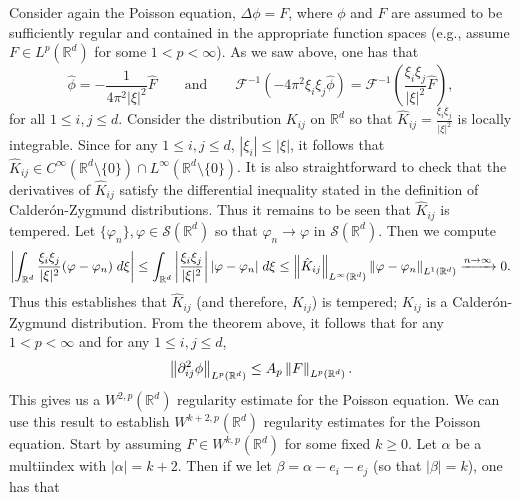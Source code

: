 \documentclass{article}
\begin{document}
\begin{example}
	Consider again the Poisson equation, $\Delta \phi = F$, where $\phi$ and $F$ are assumed to be sufficiently regular and contained in the appropriate function spaces (e.g., assume $F \in L^{p}(\mathbb{R}^{d})$ for some $1 < p < \infty$). As we saw above, one has that 
	\begin{equation*}
		\hat{\phi} = -\frac{1}{4\pi^{2}|\xi|^{2}}\hat{F} \qquad \text{and} \qquad \mathcal{F}^{-1}(-4\pi^{2}\xi_{i}\xi_{j}\hat{\phi}) = \mathcal{F}^{-1}\left(\frac{\xi_{i}\xi_{j}}{|\xi|^{2}}\hat{F}\right),
	\end{equation*}
	for all $1 \leq i, j \leq d$. Consider the distribution $K_{ij}$ on $\mathbb{R}^{d}$ so that $\hat{K}_{ij} = \frac{\xi_{i}\xi_{j}}{|\xi|^{2}}$ is locally integrable. Since for any $1 \leq i, j \leq d$, $|\xi_{i}|\leq |\xi|$, it follows that $\hat{K}_{ij} \in C^{\infty}(\mathbb{R}^{d}\setminus \{0\}) \cap L^{\infty}(\mathbb{R}^{d}\setminus \{0\})$. It is also straightforward to check that the derivatives of $\hat{K}_{ij}$ satisfy the differential inequality stated in the definition of Calder\'on-Zygmund distributions. Thus it remains to be seen that $\hat{K}_{ij}$ is tempered. Let $\{\varphi_{n}\}, \varphi \in \mathcal{S}(\mathbb{R}^{d})$ so that $\varphi_{n} \to \varphi$ in $\mathcal{S}(\mathbb{R}^{d})$. Then we compute 
	\begin{equation*}
		\left| \int_{\mathbb{R}^{d}}\frac{\xi_{i}\xi_{j}}{|\xi|^{2}}(\varphi - \varphi_{n})\;d\xi \right| \leq \int_{\mathbb{R}^{d}}\left| \frac{\xi_{i}\xi_{j}}{|\xi|^{2}} \right||\varphi - \varphi_{n}|\;d\xi \leq \left\Vert \hat{K}_{ij} \right\Vert_{L^{\infty}(\mathbb{R}^{d})}\left\Vert \varphi - \varphi_{n} \right\Vert_{L^{1}(\mathbb{R}^{d})} \xrightarrow{n \to \infty} 0. 
	\end{equation*}
	Thus this establishes that $\hat{K}_{ij}$ (and therefore, $K_{ij}$) is tempered; $K_{ij}$ is a Calder\'on-Zygmund distribution. From the theorem above, it follows that for any $1 < p < \infty$ and for any $1 \leq i, j \leq d$, 
	\begin{equation*}
		\left\Vert \partial_{ij}^{2}\phi \right\Vert_{L^{p}(\mathbb{R}^{d})} \leq A_{p}\left\Vert F \right\Vert_{L^{p}(\mathbb{R}^{d})}. 
	\end{equation*} 
	This gives us a $W^{2,p}(\mathbb{R}^{d})$ regularity estimate for the Poisson equation. We can use this result to establish $W^{k + 2,p}(\mathbb{R}^{d})$ regularity estimates for the Poisson equation. Start by assuming $F \in W^{k,p}(\mathbb{R}^{d})$ for some fixed $k \geq 0$. Let $\alpha$ be a multiindex with $|\alpha| = k + 2$. Then if we let $\beta = \alpha - e_{i} - e_{j}$ (so that $|\beta| = k$), one has that 

\end{example}
\end{document}
